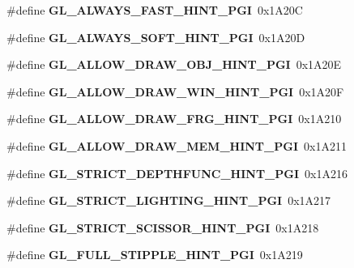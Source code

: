 \begin{DoxyCompactItemize}
\item 
\#define {\bfseries G\+L\+\_\+\+A\+L\+W\+A\+Y\+S\+\_\+\+F\+A\+S\+T\+\_\+\+H\+I\+N\+T\+\_\+\+P\+G\+I}~0x1\+A20\+C\label{_s_d_l__opengl_8h_a1c4ab95495a972766d23237f649e6cce}

\item 
\#define {\bfseries G\+L\+\_\+\+A\+L\+W\+A\+Y\+S\+\_\+\+S\+O\+F\+T\+\_\+\+H\+I\+N\+T\+\_\+\+P\+G\+I}~0x1\+A20\+D\label{_s_d_l__opengl_8h_ab6a661b32a607be0e8c9e45726ba969d}

\item 
\#define {\bfseries G\+L\+\_\+\+A\+L\+L\+O\+W\+\_\+\+D\+R\+A\+W\+\_\+\+O\+B\+J\+\_\+\+H\+I\+N\+T\+\_\+\+P\+G\+I}~0x1\+A20\+E\label{_s_d_l__opengl_8h_ae382f61f0c48135a726cac74c7ec8384}

\item 
\#define {\bfseries G\+L\+\_\+\+A\+L\+L\+O\+W\+\_\+\+D\+R\+A\+W\+\_\+\+W\+I\+N\+\_\+\+H\+I\+N\+T\+\_\+\+P\+G\+I}~0x1\+A20\+F\label{_s_d_l__opengl_8h_ab396d389538023b465d21642c506d746}

\item 
\#define {\bfseries G\+L\+\_\+\+A\+L\+L\+O\+W\+\_\+\+D\+R\+A\+W\+\_\+\+F\+R\+G\+\_\+\+H\+I\+N\+T\+\_\+\+P\+G\+I}~0x1\+A210\label{_s_d_l__opengl_8h_a38f7c48f4fb4bf4145999260c4c696b4}

\item 
\#define {\bfseries G\+L\+\_\+\+A\+L\+L\+O\+W\+\_\+\+D\+R\+A\+W\+\_\+\+M\+E\+M\+\_\+\+H\+I\+N\+T\+\_\+\+P\+G\+I}~0x1\+A211\label{_s_d_l__opengl_8h_a782d0a7224f28fa84ce82ee3351918bc}

\item 
\#define {\bfseries G\+L\+\_\+\+S\+T\+R\+I\+C\+T\+\_\+\+D\+E\+P\+T\+H\+F\+U\+N\+C\+\_\+\+H\+I\+N\+T\+\_\+\+P\+G\+I}~0x1\+A216\label{_s_d_l__opengl_8h_a9530b2e1a16f77c65216b53be88edb89}

\item 
\#define {\bfseries G\+L\+\_\+\+S\+T\+R\+I\+C\+T\+\_\+\+L\+I\+G\+H\+T\+I\+N\+G\+\_\+\+H\+I\+N\+T\+\_\+\+P\+G\+I}~0x1\+A217\label{_s_d_l__opengl_8h_a22efb1f7fcf5c4b2e563669a90e8192a}

\item 
\#define {\bfseries G\+L\+\_\+\+S\+T\+R\+I\+C\+T\+\_\+\+S\+C\+I\+S\+S\+O\+R\+\_\+\+H\+I\+N\+T\+\_\+\+P\+G\+I}~0x1\+A218\label{_s_d_l__opengl_8h_a37d1da13a1bd5e56a5984d0b9b980f37}

\item 
\#define {\bfseries G\+L\+\_\+\+F\+U\+L\+L\+\_\+\+S\+T\+I\+P\+P\+L\+E\+\_\+\+H\+I\+N\+T\+\_\+\+P\+G\+I}~0x1\+A219\label{_s_d_l__opengl_8h_a25b38ba1148499c93c6c1b8e407a5aac}


\end{DoxyCompactItemize}
